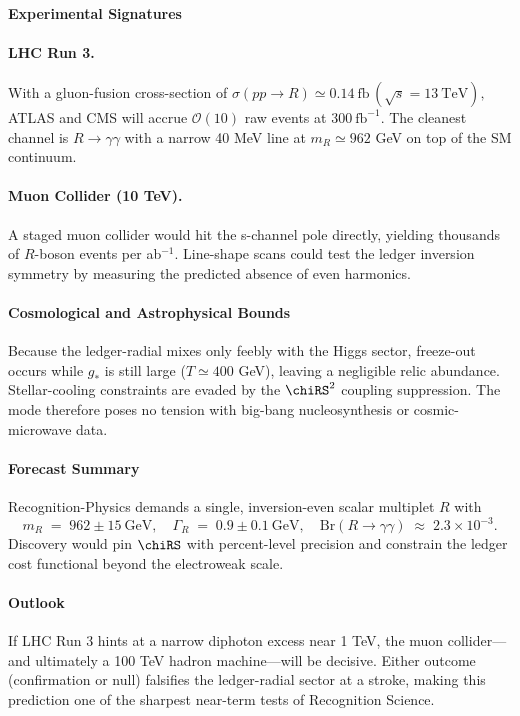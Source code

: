 \documentclass[11pt,oneside]{book}
\begin{document}
{\paragraph{Experimental Signatures}

\paragraph{LHC Run 3.}
With a gluon-fusion cross-section of
\(
   \sigma(pp\!\to\!R)\simeq 0.14~\text{fb}
   \,(\sqrt s=13~\text{TeV}),
\)
ATLAS and CMS will accrue \(\mathcal{O}(10)\) raw events at
\(300~\text{fb}^{-1}\).  The cleanest channel is
\(R\!\to\!\gamma\gamma\) with a narrow 40 MeV line at
\(m_{R}\simeq962\) GeV on top of the SM continuum.

\paragraph{Muon Collider (10 TeV).}
A staged muon collider would hit the s-channel pole directly, yielding
thousands of \(R\)-boson events per ab\(^{-1}\).  Line-shape scans
could test the ledger inversion symmetry by measuring the predicted
absence of even harmonics.

\paragraph{Cosmological and Astrophysical Bounds}
Because the ledger-radial mixes only feebly with the Higgs sector,
freeze-out occurs while \(g_{*}\) is still large (\(T\simeq400\) GeV),
leaving a negligible relic abundance.  Stellar-cooling constraints are
evaded by the \(\chiRS^{2}\) coupling suppression.  The mode therefore
poses no tension with big-bang nucleosynthesis or cosmic-microwave data.

\paragraph{Forecast Summary}
Recognition-Physics demands a single, inversion-even scalar
multiplet \(R\) with
\[
   m_{R}\;=\;962\pm15~\text{GeV},\quad
   \Gamma_{R}\;=\;0.9\pm0.1~\text{GeV},\quad
   \text{Br}(R\!\to\!\gamma\gamma)\;\approx\;2.3\times10^{-3}.
\]
Discovery would pin \(\chiRS\) with percent-level precision and
constrain the ledger cost functional beyond the electroweak scale.

\paragraph*{Outlook}
If LHC Run 3 hints at a narrow diphoton excess near 1 TeV, the muon
collider—and ultimately a 100 TeV hadron machine—will be decisive.
Either outcome (confirmation or null) falsifies the ledger-radial
sector at a stroke, making this prediction one of the sharpest
near-term tests of Recognition Science.

}
\end{document}
